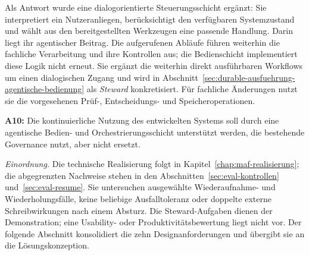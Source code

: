 Als Antwort wurde eine dialogorientierte Steuerungsschicht ergänzt:
Sie interpretiert ein Nutzeranliegen, berücksichtigt den verfügbaren
Systemzustand und wählt aus den bereitgestellten Werkzeugen eine passende
Handlung. Darin liegt ihr agentischer Beitrag. Die aufgerufenen Abläufe
führen weiterhin die fachliche Verarbeitung und ihre Kontrollen aus;
die Bedienschicht implementiert diese Logik nicht erneut. Sie ergänzt
die weiterhin direkt ausführbaren Workflows um einen dialogischen Zugang
und wird in Abschnitt~\ref{sec:durable-ausfuehrung-agentische-bedienung}
als \emph{Steward} konkretisiert. Für fachliche Änderungen nutzt sie die
vorgesehenen Prüf-, Entscheidungs- und Speicheroperationen.

\textbf{A10:} Die kontinuierliche Nutzung des entwickelten Systems soll
durch eine agentische Bedien- und Orchestrierungsschicht unterstützt
werden, die bestehende Governance nutzt, aber nicht ersetzt.

\emph{Einordnung.} Die technische Realisierung folgt in
Kapitel~\ref{chap:maf-realisierung}; die abgegrenzten Nachweise stehen
in den Abschnitten~\ref{sec:eval-kontrollen} und~\ref{sec:eval-resume}.
Sie untersuchen ausgewählte Wiederaufnahme- und Wiederholungsfälle,
keine beliebige Ausfalltoleranz oder doppelte externe Schreibwirkungen
nach einem Absturz. Die Steward-Aufgaben dienen der Demonstration;
eine Usability- oder Produktivitätsbewertung liegt nicht vor. Der
folgende Abschnitt konsolidiert die zehn Designanforderungen und
übergibt sie an die Lösungskonzeption.
